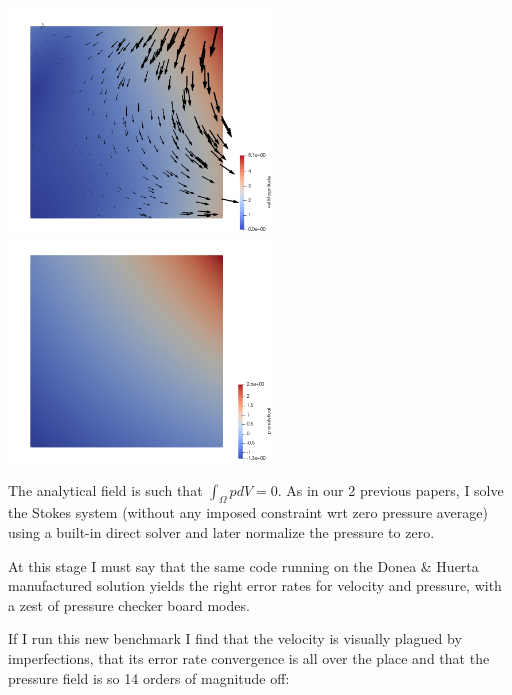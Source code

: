 \documentclass[a4paper]{article}
\begin{document}
\begin{center}
\includegraphics[width=7cm]{../results/exp09/vel.png}
\includegraphics[width=7cm]{../results/exp09/press.png}
\end{center}

The analytical field is such that $\int_\Omega p dV= 0$.
As in our 2 previous papers, I solve the Stokes system (without 
any imposed constraint wrt zero pressure average) using a built-in direct solver
and later normalize the pressure to zero.

At this stage I must say that the same code running on the Donea \& Huerta manufactured
solution yields the right error rates for velocity and pressure, with a zest of pressure 
checker board modes.

If I run this new benchmark I find that the velocity is visually plagued by imperfections, 
that its error rate convergence is all over the place and that the pressure field 
is so 14 orders of magnitude off:
\end{document}
